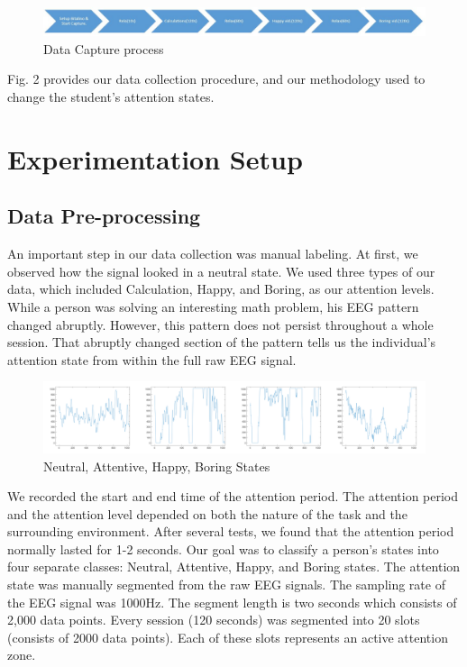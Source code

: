 \documentclass[conference]{IEEEtran}
\begin{document}
\begin{figure}[htbp]
\centerline{\includegraphics[scale=.35]{figures/Data_Capture.JPG}}
\caption{Data Capture process}
\label{fig}
\end{figure}
Fig. 2 provides our data collection procedure, and our methodology used to change the student’s attention states.

\section{Experimentation Setup}

\subsection{Data Pre-processing}\label{dp}
An important step in our data collection was manual labeling. At first, we observed how the signal looked in a neutral state.  We used three types of our data, which included Calculation, Happy, and Boring, as our attention levels. While a person was solving an interesting math problem, his EEG pattern changed abruptly.  However, this pattern does not persist throughout a whole session. That abruptly changed section of the pattern tells us the individual’s attention state from within the full raw EEG signal.

\begin{figure}[htbp]
\centerline{\includegraphics[scale=.023]{figures/four_states.png}}
\caption{Neutral, Attentive, Happy, Boring States}
\label{fig}
\end{figure}

We recorded the start and end time of the attention period. The attention period and the attention level depended on both the nature of the task and the surrounding environment. After several tests, we found that the attention period normally lasted for 1-2 seconds.  Our goal was to classify a person’s states into four separate classes:  Neutral, Attentive, Happy, and Boring states. The attention state was manually segmented from the raw EEG signals. The sampling rate of the EEG signal was 1000Hz. The segment length is two seconds which consists of 2,000 data points. Every session (120 seconds) was segmented into 20 slots (consists of 2000 data points). Each of these slots represents an active attention zone.
 
\end{document}
